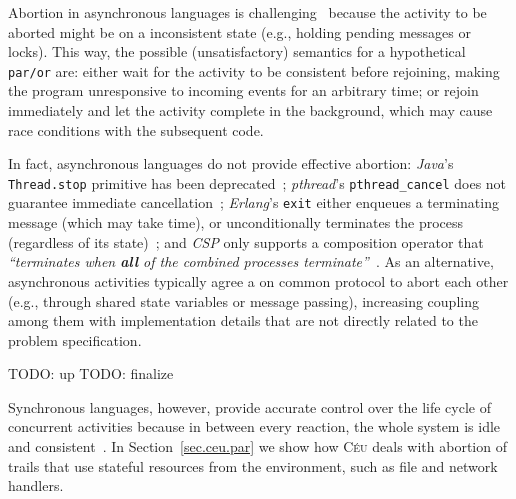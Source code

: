 \documentclass{acm_proc_article-sp}
\newcommand{\CEU}{\textsc{C\'{e}u}\xspace}
\newcommand{\code}[1] {{\small{\texttt{#1}}}}
\newcommand{\1}{\;}
\newcommand{\2}{\;\;}
\newcommand{\3}{\;\;\;}
\newcommand{\5}{\;\;\;\;\;}
\begin{document}

Abortion in asynchronous languages is challenging~\cite{esterel.preemption} 
because the activity to be aborted might be on a inconsistent state (e.g., 
holding pending messages or locks).
%
This way, the possible (unsatisfactory) semantics for a hypothetical 
\code{par/or} are:
either wait for the activity to be consistent before rejoining, making the 
program unresponsive to incoming events for an arbitrary time;
or rejoin immediately and let the activity complete in the background, which 
may cause race conditions with the subsequent code.


In fact, asynchronous languages do not provide effective abortion:
\emph{Java}'s \code{Thread.stop} primitive has been 
deprecated~\cite{sync_async.threadsstop};
\emph{pthread}'s \code{pthread\_cancel} does not guarantee immediate 
cancellation~\cite{sync_async.pthreadsstop};
\emph{Erlang}'s \code{exit} either enqueues a terminating message (which may 
take time), or unconditionally terminates the process (regardless of its 
state)~\cite{sync_async.erlangstop};
and \emph{CSP} only supports a composition operator that \emph{``terminates 
when \textbf{all} of the combined processes terminate''}~\cite{async.csp}.
%
As an alternative, asynchronous activities typically agree a on common protocol 
to abort each other (e.g., through shared state variables or message passing), 
increasing coupling among them with implementation details that are not 
directly related to the problem specification.

TODO: up
TODO: finalize

Synchronous languages, however, provide accurate control over the life cycle of 
concurrent activities because in between every reaction, the whole system is 
idle and consistent~\cite{esterel.preemption}.
%
In Section~\ref{sec.ceu.par} we show how \CEU deals with abortion of trails 
that use stateful resources from the environment, such as file and network 
handlers.
\end{document}
